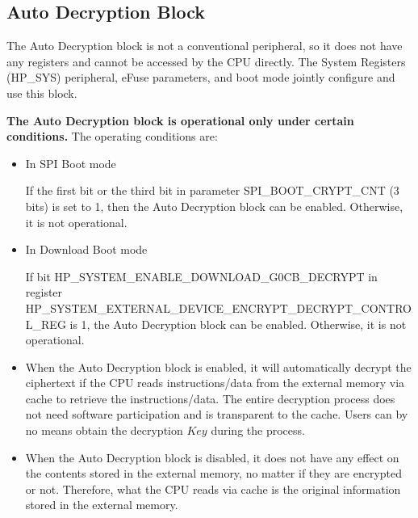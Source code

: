 \documentclass[main\_\_EN.tex]{subfiles}
\begin{document}
\subsection{Auto Decryption Block}

The Auto Decryption block is not a conventional peripheral, so it does not have any registers and cannot be accessed by the CPU directly. The System Registers (HP\_SYS) peripheral, eFuse parameters, and boot mode jointly configure and use this block.

\textbf{The Auto Decryption block is operational only under certain conditions.} The operating conditions are:

\begin{itemize}
    
    \item In SPI Boot mode
    
    If the first bit or the third bit in parameter SPI\_BOOT\_CRYPT\_CNT (3 bits) is set to 1, then the Auto Decryption block can be enabled. Otherwise, it is not operational.
    
    \item In Download Boot mode
    
    If bit HP\_SYSTEM\_ENABLE\_DOWNLOAD\_G0CB\_DECRYPT in register\\ HP\_SYSTEM\_EXTERNAL\_DEVICE\_ENCRYPT\_DECRYPT\_CONTROL\_REG is 1, the Auto Decryption block can be enabled. Otherwise, it is not operational.
    
\end{itemize}

\begin{tiplisting}
\vspace{-2em}
\begin{itemize}

\item When the Auto Decryption block is enabled, it will automatically decrypt the ciphertext if the CPU reads instructions/data from the external memory via cache to retrieve the instructions/data. The entire decryption process does not need software participation and is transparent to the cache. Users can by no means obtain the decryption \begin{math}\mathit{Key}\end{math} during the process.

\item When the Auto Decryption block is disabled, it does not have any effect on the contents stored in the external memory, no matter if they are encrypted or not. Therefore, what the CPU reads via cache is the original information stored in the external memory.

\end{itemize}
\end{tiplisting}
\end{document}
